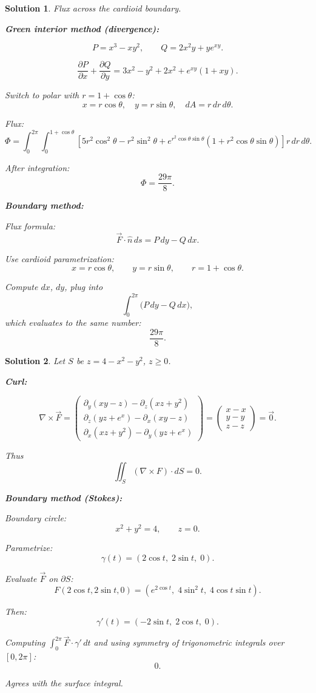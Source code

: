 \documentclass{article}
\newtheorem{solution}{Solution}
\begin{document}
\begin{solution}
Flux across the cardioid boundary.

\textbf{Green interior method (divergence):}

\[
P = x^3 - xy^2,\qquad Q = 2x^2 y + y e^{xy}.
\]

\[
\frac{\partial P}{\partial x} + \frac{\partial Q}{\partial y}
= 3x^2 - y^2 + 2x^2 + e^{xy}(1 + xy).
\]

Switch to polar with $r = 1 + \cos\theta$:
\[
x = r\cos\theta,\quad y = r\sin\theta,\quad dA = r\, dr\, d\theta.
\]

Flux:
\[
\Phi = \int_0^{2\pi}\int_0^{1+\cos\theta}
\left[5r^2\cos^2\theta - r^2\sin^2\theta 
+ e^{r^2\cos\theta\sin\theta}(1 + r^2\cos\theta\sin\theta)\right]
r\, dr\, d\theta.
\]

After integration:
\[
\boxed{ \Phi = \frac{29\pi}{8} }.
\]

\textbf{Boundary method:}

Flux formula:
\[
\vec{F}\cdot\hat{n}\, ds = P\,dy - Q\,dx.
\]

Use cardioid parametrization:
\[
x = r\cos\theta,\qquad y = r\sin\theta,\qquad r = 1+\cos\theta.
\]

Compute $dx$, $dy$, plug into
\[
\int_0^{2\pi} \big( P\,dy - Q\,dx \big),
\]
which evaluates to the same number:
\[
\boxed{\frac{29\pi}{8}}.
\]
\end{solution}

\begin{solution}
Let $S$ be $z = 4 - x^2 - y^2$, $z\ge 0$.

\textbf{Curl:}

\[
\nabla\times \vec{F}
=
\begin{pmatrix}
\partial_y(xy - z) - \partial_z(xz+y^2) \\
\partial_z(yz + e^x) - \partial_x(xy - z) \\
\partial_x(xz + y^2) - \partial_y(yz+e^x)
\end{pmatrix}
=
\begin{pmatrix}
x - x \\ 
y - y \\
z - z
\end{pmatrix}
=
\vec{0}.
\]

Thus
\[
\iint_S (\nabla\times F)\cdot dS = 0.
\]

\textbf{Boundary method (Stokes):}

Boundary circle:
\[
x^2 + y^2 = 4,\qquad z = 0.
\]

Parametrize:
\[
\gamma(t) = (2\cos t,\; 2\sin t,\; 0).
\]

Evaluate $\vec{F}$ on $\partial S$:
\[
F(2\cos t,2\sin t,0) = (e^{2\cos t},\; 4\sin^2 t,\; 4\cos t\sin t).
\]

Then:
\[
\gamma'(t) = (-2\sin t,\; 2\cos t,\; 0).
\]

Computing $\int_0^{2\pi} \vec{F}\cdot\gamma'\,dt$ and using symmetry of trigonometric integrals over $[0,2\pi]$:
\[
\boxed{0}.
\]

Agrees with the surface integral.
\end{solution}
\end{document}
